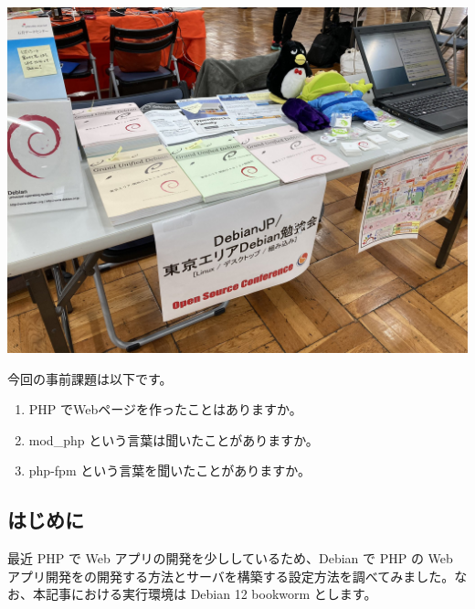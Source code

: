 \documentclass[mingoth,a4paper]{jsarticle}
\begin{document}
\begin{center}
  \includegraphics[width=0.30\hsize]{image202304/osc2023spring-booth.jpg}
\end{center}



今回の事前課題は以下です。

\begin{enumerate}
  \item PHP でWebページを作ったことはありますか。
  \item mod\_php という言葉は聞いたことがありますか。
  \item php-fpm という言葉を聞いたことがありますか。
\end{enumerate}


\begin{multicols}{2}
{\small

}
\end{multicols}

%
%
%
%


      

\subsection{はじめに}

最近 PHP で Web アプリの開発を少ししているため、Debian で PHP の Web アプリ開発をの開発する方法とサーバを構築する設定方法を調べてみました。なお、本記事における実行環境は Debian 12 bookworm とします。
\end{document}
